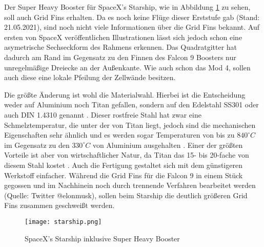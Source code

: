 Der Super Heavy Booster für SpaceX's Starship, wie in Abbildung \ref{abb_starship} zu sehen, soll auch Grid Fins erhalten. Da es noch keine Flüge dieser Erststufe gab (Stand: 21.05.2021), sind noch nicht viele Informationen über die Grid Fins bekannt. Auf ersten von SpaceX veröffentlichen Illustrationen lässt sich jedoch schon eine asymetrische Sechseckform des Rahmens erkennen. Das Quadratgitter hat dadurch am Rand im Gegensatz zu den Finnen des Falcon 9 Boosters nur unregelmäßige Dreiecke an der Außenkante. Wie auch schon das Mod 4, sollen auch diese eine lokale Pfeilung der Zellwände besitzen.

Die größte Änderung ist wohl die Materialwahl. Hierbei ist die Entscheidung weder auf Aluminium noch Titan gefallen, sondern auf den Edelstahl SS301 oder auch DIN 1.4310 genannt \cite{titanium}. Dieser rostfreie Stahl hat zwar eine Schmelztemperatur, die unter der von Titan liegt, jedoch sind die mechanischen Eigenschaften sehr ähnlich und es werden sogar Temperaturen von bis zu $840^\circ C$ im Gegensatz zu den $330^\circ C$ von Aluminium ausgehalten \cite{titanium}. Einer der größten Vorteile ist aber von wirtschaftlicher Natur, da Titan das 15- bis 20-fache von diesem Stahl kostet \cite{titanium}. Auch die Fertigung gestaltet sich mit dem günstigeren Werkstoff einfacher. Während die Grid Fins für die Falcon 9 in einem Stück gegossen und im Nachhinein noch durch trennende Verfahren bearbeitet werden (Quelle: Twitter @elonmusk), sollen beim Starship die deutlich größeren Grid Fins zusammen geschweißt werden.
\begin{figure}[h]
	\centering
	\texttt{[image: starship.png]}
	\begin{flushright}
	\end{flushright}
	\caption{SpaceX's Starship inklusive Super Heavy Booster}
	\label{abb_starship}
\end{figure}\\
